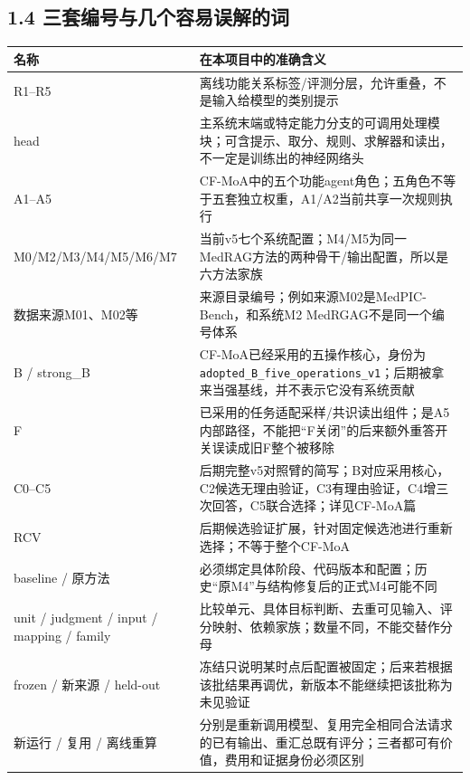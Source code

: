 \documentclass[
  11pt,
  a4paper,
]{article}
\newcounter{none} %
\begin{document}
\subsection{1.4
三套编号与几个容易误解的词}\label{ux4e09ux5957ux7f16ux53f7ux4e0eux51e0ux4e2aux5bb9ux6613ux8befux89e3ux7684ux8bcd}

{\def\LTcaptype{none} %
\begin{longtable}[]{@{}
  >{\raggedright\arraybackslash}p{}
  >{\raggedright\arraybackslash}p{}@{}}
\toprule\noalign{}
\begin{minipage}[b]{\linewidth}\raggedright
名称
\end{minipage} & \begin{minipage}[b]{\linewidth}\raggedright
在本项目中的准确含义
\end{minipage} \\
\midrule\noalign{}
\endhead
\bottomrule\noalign{}
\endlastfoot
R1--R5 &
离线功能关系标签/评测分层，允许重叠，不是输入给模型的类别提示 \\
head &
主系统末端或特定能力分支的可调用处理模块；可含提示、取分、规则、求解器和读出，不一定是训练出的神经网络头 \\
A1--A5 &
CF-MoA中的五个功能agent角色；五角色不等于五套独立权重，A1/A2当前共享一次规则执行 \\
M0/\allowbreak{}M2/\allowbreak{}M3/\allowbreak{}M4/\allowbreak{}M5/\allowbreak{}M6/\allowbreak{}M7
&
当前v5七个系统配置；M4/M5为同一MedRAG方法的两种骨干/输出配置，所以是六方法家族 \\
数据来源M01、M02等 & 来源目录编号；例如来源M02是MedPIC-Bench，和系统M2
MedRGAG不是同一个编号体系 \\
B / strong\_B &
CF-MoA已经采用的五操作核心，身份为\texttt{adopted\_\allowbreak{}B\_\allowbreak{}five\_\allowbreak{}operations\_\allowbreak{}v1}；后期被拿来当强基线，并不表示它没有系统贡献 \\
F &
已采用的任务适配采样/共识读出组件；是A5内部路径，不能把``F关闭''的后来额外重答开关误读成旧F整个被移除 \\
C0--C5 &
后期完整v5对照臂的简写；B对应采用核心，C2候选无理由验证，C3有理由验证，C4增三次回答，C5联合选择；详见CF-MoA篇 \\
RCV & 后期候选验证扩展，针对固定候选池进行重新选择；不等于整个CF-MoA \\
baseline / 原方法 &
必须绑定具体阶段、代码版本和配置；历史``原M4''与结构修复后的正式M4可能不同 \\
unit / judgment / input / mapping / family &
比较单元、具体目标判断、去重可见输入、评分映射、依赖家族；数量不同，不能交替作分母 \\
frozen / 新来源 / held-out &
冻结只说明某时点后配置被固定；后来若根据该批结果再调优，新版本不能继续把该批称为未见验证 \\
新运行 / 复用 / 离线重算 &
分别是重新调用模型、复用完全相同合法请求的已有输出、重汇总既有评分；三者都可有价值，费用和证据身份必须区别 \\
\end{longtable}
}
\end{document}
